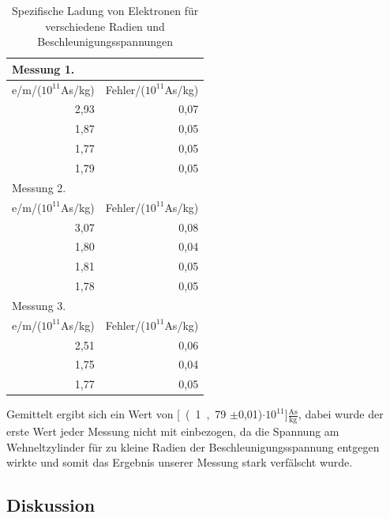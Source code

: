 \documentclass[12pt,a4paper]{article}
\begin{document}
\begin{table}[H]
\caption{Spezifische Ladung von Elektronen für verschiedene Radien und Beschleunigungsspannungen}
\begin{center}
\begin{tabular}{|r|r|}
\hline
\multicolumn{1}{|l|}{Messung 1.} & \multicolumn{1}{l|}{} \\ \hline
\multicolumn{1}{|l|}{e/m/($10^{11}$As/kg)} & \multicolumn{1}{l|}{Fehler/($10^{11}$As/kg)} \\ \hline
2,93 & 0,07 \\ \hline
1,87 & 0,05 \\ \hline
1,77 & 0,05 \\ \hline
1,79 & 0,05 \\ \hline \hline
\multicolumn{1}{|l|}{Messung 2.} & \multicolumn{1}{l|}{} \\ \hline
\multicolumn{1}{|l|}{e/m/($10^{11}$As/kg)} & \multicolumn{1}{l|}{Fehler/($10^{11}$As/kg)} \\ \hline
3,07 & 0,08 \\ \hline
1,80 & 0,04 \\ \hline
1,81 & 0,05 \\ \hline
1,78 & 0,05 \\ \hline \hline
\multicolumn{1}{|l|}{Messung 3.} & \multicolumn{1}{l|}{} \\ \hline
\multicolumn{1}{|l|}{e/m/($10^{11}$As/kg)} & \multicolumn{1}{l|}{Fehler/($10^{11}$As/kg)} \\ \hline
2,51 & 0,06 \\ \hline
1,75 & 0,04 \\ \hline
1,77 & 0,05 \\ \hline
\end{tabular}
\end{center}
\label{tab:aus_e/m}
\end{table}

Gemittelt ergibt sich ein Wert von \unit[(1,79 $\pm$0,01)$\cdot 10^{11}$]{$\frac{\text{As}}{\text{kg}}$}, dabei wurde der erste Wert jeder Messung nicht mit einbezogen, da die Spannung am Wehneltzylinder für zu kleine Radien der Beschleunigungsspannung entgegen wirkte und somit das Ergebnis unserer Messung stark verfälscht wurde.
\newpage
\subsection{Diskussion}
\end{document}
